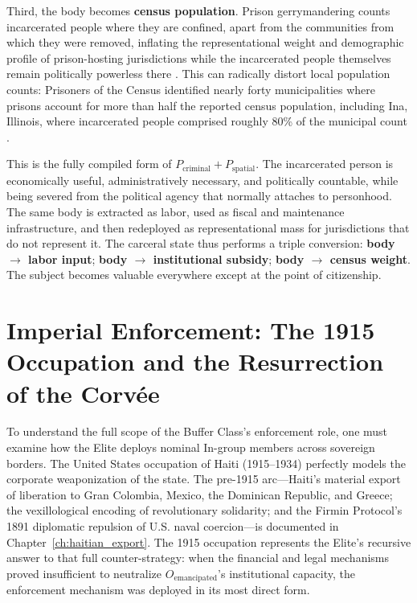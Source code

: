 Third, the body becomes \textbf{census population}. Prison gerrymandering counts incarcerated people where they are confined, apart from the communities from which they were removed, inflating the representational weight and demographic profile of prison-hosting jurisdictions while the incarcerated people themselves remain politically powerless there \cite{brennan_prison_gerrymandering_2025, redistrictingdatahub_prison_gerrymandering}. This can radically distort local population counts: Prisoners of the Census identified nearly forty municipalities where prisons account for more than half the reported census population, including Ina, Illinois, where incarcerated people comprised roughly 80\% of the municipal count \cite{prisoners_census_municipal_2020}.

This is the fully compiled form of $P_{\text{criminal}} + P_{\text{spatial}}$. The incarcerated person is economically useful, administratively necessary, and politically countable, while being severed from the political agency that normally attaches to personhood. The same body is extracted as labor, used as fiscal and maintenance infrastructure, and then redeployed as representational mass for jurisdictions that do not represent it. The carceral state thus performs a triple conversion: \textbf{body $\rightarrow$ labor input}; \textbf{body $\rightarrow$ institutional subsidy}; \textbf{body $\rightarrow$ census weight}. The subject becomes valuable everywhere except at the point of citizenship.

\section{Imperial Enforcement: The 1915 Occupation and the Resurrection of the Corv\'{e}e}
\label{sec:haiti_occupation}

To understand the full scope of the Buffer Class's enforcement role, one must examine how the Elite deploys nominal In-group members across sovereign borders. The United States occupation of Haiti (1915–1934) perfectly models the corporate weaponization of the state. The pre-1915 arc---Haiti's material export of liberation to Gran Colombia, Mexico, the Dominican Republic, and Greece; the vexillological encoding of revolutionary solidarity; and the Firmin Protocol's 1891 diplomatic repulsion of U.S. naval coercion---is documented in Chapter~\ref{ch:haitian_export}. The 1915 occupation represents the Elite's recursive answer to that full counter-strategy: when the financial and legal mechanisms proved insufficient to neutralize $O_{\text{emancipated}}$'s institutional capacity, the enforcement mechanism was deployed in its most direct form.

